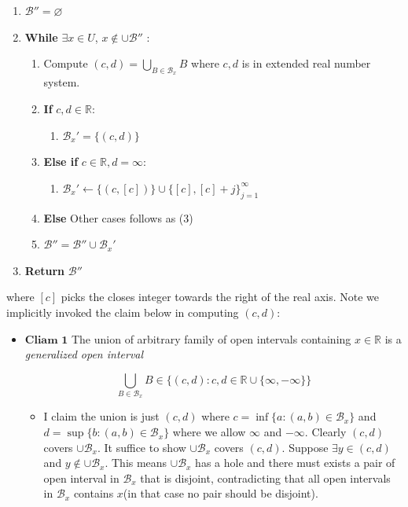 \begin{mystsolution}
\begin{mystprfalgorithm}
\begin{enumerate}
\item $\mathcal B'' = \varnothing$
\item \textbf{While} $\exists x\in U$,  $x\notin \cup \mathcal B''$ :

\begin{enumerate}
\item Compute $(c,d)=\bigcup_{B\in \mathcal B_x} B$ where $c,d$ is in extended real number system.
\item \textbf{If} $c,d\in \mathbb{R}$:

\begin{enumerate}
\item $\mathcal{B}_x'=\{(c,d)\}$
\end{enumerate}


\item \textbf{Else if} $c\in \mathbb{R}, d=\infty$:

\begin{enumerate}
\item $\mathcal{B}_x'\gets \{(c,[c])\}\cup \{[c],[c]+j\}_{j=1}^{\infty}$
\end{enumerate}


\item \textbf{Else}
Other cases follows as (3)
\item $\mathcal B'' = \mathcal B'' \cup \mathcal B_x '$
\end{enumerate}


\item \textbf{Return} $\mathcal B''$
\end{enumerate}

\end{mystprfalgorithm}
where $[c]$ picks the closes integer towards the right of the real axis.
Note we implicitly invoked the claim below in computing $(c,d)$:

\begin{itemize}
\item $\boxed{\textbf{Cliam 1}}$ The union of arbitrary family of open intervals containing $x\in \mathbb{R}$ is a \textit{generalized open interval}

\begin{equation}
\bigcup_{B\in \mathcal B_x} B\in \{(c,d): c,d\in \mathbb{R}\cup \{\infty, -\infty\}\}
\end{equation}

\begin{itemize}
\item I claim the union is just $(c,d)$ where $c=\inf \{a:(a,b)\in \mathcal B_x\}$ and $d=\sup \{b:(a,b)\in \mathcal B_x\}$ where we allow $\infty$ and $-\infty$. Clearly $(c,d)$ covers $\cup \mathcal B_x$. It suffice to show $\cup \mathcal B_x$ covers $(c,d)$. Suppose $\exists y \in (c,d)$ and $y\notin \cup \mathcal B_x$. This means $\cup \mathcal B_x$ has a hole and there must exists a pair of open interval in $\mathcal B_x$ that is disjoint, contradicting that all open intervals in $\mathcal B_x$ contains $x$(in that case no pair should be disjoint).
\end{itemize}
\end{itemize}


\end{mystsolution}
